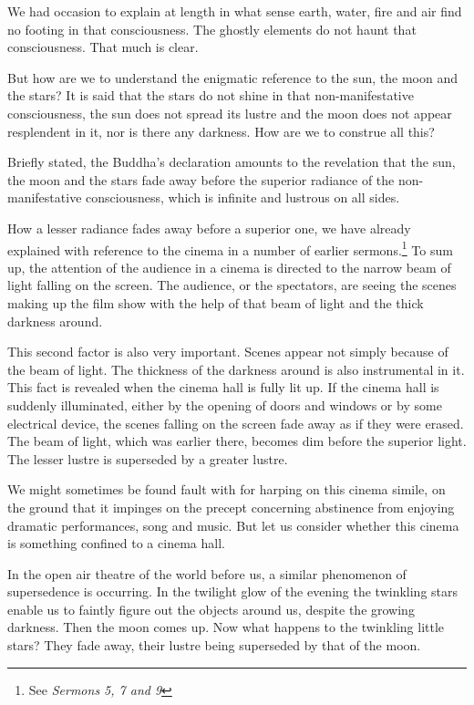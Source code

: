 We had occasion to explain at length in what sense earth, water, fire and air find no footing in that consciousness. The ghostly elements do not haunt that consciousness. That much is clear.

But how are we to understand the enigmatic reference to the sun, the moon and the stars? It is said that the stars do not shine in that non-manifestative consciousness, the sun does not spread its lustre and the moon does not appear resplendent in it, nor is there any darkness. How are we to construe all this?

Briefly stated, the Buddha's declaration amounts to the revelation that the sun, the moon and the stars fade away before the superior radiance of the non-manifestative consciousness, which is infinite and lustrous on all sides.

How a lesser radiance fades away before a superior one, we have already explained with reference to the cinema in a number of earlier sermons.\footnote{See \emph{Sermons 5, 7 and 9}} To sum up, the attention of the audience in a cinema is directed to the narrow beam of light falling on the screen. The audience, or the spectators, are seeing the scenes making up the film show with the help of that beam of light and the thick darkness around.

This second factor is also very important. Scenes appear not simply because of the beam of light. The thickness of the darkness around is also instrumental in it. This fact is revealed when the cinema hall is fully lit up. If the cinema hall is suddenly illuminated, either by the opening of doors and windows or by some electrical device, the scenes falling on the screen fade away as if they were erased. The beam of light, which was earlier there, becomes dim before the superior light. The lesser lustre is superseded by a greater lustre.

We might sometimes be found fault with for harping on this cinema simile, on the ground that it impinges on the precept concerning abstinence from enjoying dramatic performances, song and music. But let us consider whether this cinema is something confined to a cinema hall.

In the open air theatre of the world before us, a similar phenomenon of supersedence is occurring. In the twilight glow of the evening the twinkling stars enable us to faintly figure out the objects around us, despite the growing darkness. Then the moon comes up. Now what happens to the twinkling little stars? They fade away, their lustre being superseded by that of the moon.

